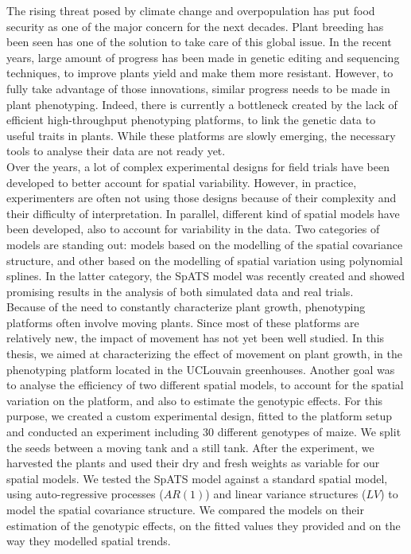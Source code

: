 The rising threat posed by climate change and overpopulation has put food security as one of the major concern for the next decades. Plant breeding has been seen has one of the solution to take care of this global issue. In the recent years, large amount of progress has been made in genetic editing and sequencing techniques, to improve plants yield and make them more resistant. However, to fully take advantage of those innovations, similar progress needs to be made in plant phenotyping.
Indeed, there is currently a bottleneck created by the lack of efficient high-throughput phenotyping platforms, to link the genetic data to useful traits in plants. 
While these platforms are slowly emerging, the necessary tools to analyse their data are not ready yet.\\


Over the years, a lot of complex experimental designs for field trials have been developed to better account for spatial variability. However, in practice, experimenters are often not using those designs because of their complexity and their difficulty of interpretation. In parallel, different kind of spatial models have been developed, also to account for variability in the data. Two categories of models are standing out: models based on the modelling of the spatial covariance structure, and other based on the modelling of spatial variation using polynomial splines. In the latter category, the SpATS model was recently created and showed promising results in the analysis of both simulated data and real trials.\\


Because of the need to constantly characterize plant growth, phenotyping platforms often involve moving plants. Since most of these platforms are relatively new, the impact of movement has not yet been well studied. In this thesis, we aimed at characterizing the effect of movement on plant growth, in the phenotyping platform located in the UCLouvain greenhouses. Another goal was to analyse the efficiency of two different spatial models, to account for the spatial variation on the platform, and also to estimate the genotypic effects. For this purpose, we created a custom experimental design, fitted to the platform setup and conducted an experiment including 30 different genotypes of maize. We split the seeds between a moving tank and a still tank. After the experiment, we harvested the plants and used their dry and fresh weights as variable for our spatial models. We tested the SpATS model against a standard spatial model, using auto-regressive processes ($AR(1)$) and linear variance structures ($LV$) to model the spatial covariance structure. We compared the models on their estimation of the genotypic effects, on the fitted values they provided and on the way they modelled spatial trends.\\


